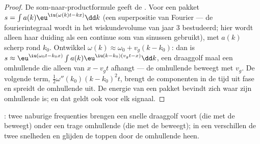 \begin{proof}
De som-naar-productformule geeft de . Voor een pakket
$s =
\int a(k)\eu^{\iu(\omega(k)t - kx)}\dd k$ (een superpositie van Fourier
--- de fourierintegraal wordt in het wiskundevolume van jaar 3 bestudeerd;
hier wordt alleen haar duiding als een continue som van sinussen gebruikt),
met $a(k)$ scherp rond $k_0$. Ontwikkel
$\omega(k) \approx \omega_0 + v_g(k - k_0)$: dan is
$s \approx \eu^{\iu(\omega_0t - k_0x)}\int a(k)\eu^{\iu(k - k_0)(v_gt - x)}\dd k$,
een draaggolf maal een omhullende die alleen van $x - v_gt$ afhangt --- de
omhullende beweegt met $v_g$. De volgende term,
$\tfrac12\omega''(k_0)(k - k_0)^2t$, brengt de componenten in de tijd uit
fase en spreidt de omhullende uit. De energie van een pakket bevindt zich
waar zijn omhullende is; en dat geldt ook voor elk signaal.
\end{proof}

\begin{omfigure}

{\small {}: twee naburige frequenties brengen een snelle draaggolf
voort (die met de  beweegt) onder een trage omhullende (die met
de  beweegt); in een  verschillen de twee
snelheden en glijden de toppen door de omhullende heen.}
\end{omfigure}

